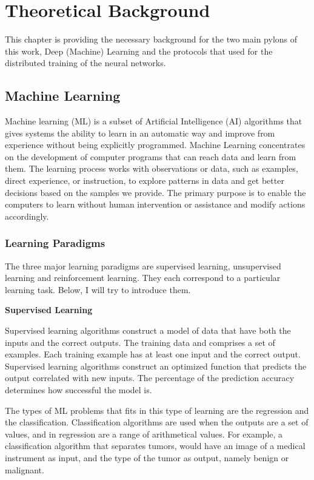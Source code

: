 \chapter{Theoretical Background}\label{ch:theoretical-background}

This chapter is providing the necessary background for the two main pylons of this work, Deep (Machine) Learning and the
protocols that used for the distributed training of the neural networks.


\section{Machine Learning}\label{sec:machine-learning}

Machine learning (ML) is a subset of Artificial Intelligence (AI) algorithms that gives systems the ability to learn in
an automatic way and improve from experience without
being explicitly programmed.
Machine Learning concentrates on the development of computer programs that can reach data and learn from them.
The learning process works with observations or data, such as examples, direct experience, or instruction, to explore
patterns in data and get better decisions based on the
samples we provide.
The primary purpose is to enable the computers to learn without human intervention or assistance
and modify actions accordingly.

\subsection{Learning Paradigms}\label{subsec:learning-paradigms}

The three major learning paradigms are supervised learning, unsupervised learning and reinforcement learning.
They each correspond to a particular learning task.
Below, I will try to introduce them.

{\large \textbf{Supervised Learning}}

Supervised learning algorithms construct a model of data that have both the
inputs and the correct outputs.
The training data and comprises a set of examples.
Each training example has at least one input and the correct output.
Supervised learning algorithms construct an optimized function that predicts the output correlated with new inputs.
The percentage of the prediction accuracy determines how successful the model is.

The types of ML problems that fits in this type of learning are the regression and the classification.
Classification algorithms are used when the outputs are  a set of values, and in regression are a range of arithmetical values.
For example, a classification algorithm that separates tumors, would have an image of a
medical instrument as input, and the type of the tumor as output, namely benign or malignant.

